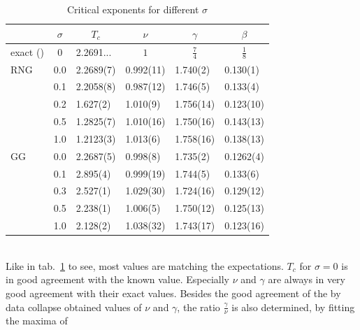     \begin{table}[htbp]
        \center
        \begin{tabular}{l l l l l l}
            \toprule
             & \multicolumn{1}{c}{\(\sigma\)} & \multicolumn{1}{c}{\(T_c\)} & \multicolumn{1}{c}{\(\nu\)} & \multicolumn{1}{c}{\(\gamma\)} & \multicolumn{1}{c}{\(\beta\)}\\
            \midrule
            exact (\cite[p. 59]{Pelissetto2002}) & \multicolumn{1}{c}{\(0\)} & 2.2691... & \multicolumn{1}{c}{\(1\)} & \multicolumn{1}{c}{\(\frac{7}{4}\)} & \multicolumn{1}{c}{\(\frac{1}{8}\)}\\
            \midrule
            RNG          & 0.0 & 2.2689(7)& 0.992(11)& 1.740(2) & 0.130(1) \\
                         & 0.1 & 2.2058(8)& 0.987(12)& 1.746(5) & 0.133(4) \\
                         & 0.2 & 1.627(2) & 1.010(9) & 1.756(14)& 0.123(10)\\
                         & 0.5 & 1.2825(7)& 1.010(16)& 1.750(16)& 0.143(13)\\
                         & 1.0 & 1.2123(3)& 1.013(6) & 1.758(16)& 0.138(13)\\
            \midrule
            GG           & 0.0 & 2.2687(5)& 0.998(8) & 1.735(2) & 0.1262(4)\\
                         & 0.1 & 2.895(4) & 0.999(19)& 1.744(5) & 0.133(6) \\
                         & 0.3 & 2.527(1) & 1.029(30)& 1.724(16)& 0.129(12)\\
                         & 0.5 & 2.238(1) & 1.006(5) & 1.750(12)& 0.125(13)\\
                         & 1.0 & 2.128(2) & 1.038(32)& 1.743(17)& 0.123(16)\\

            \bottomrule
        \end{tabular}
        \caption[Critical Exponents for Different $\sigma$]{Critical exponents for different $\sigma$}
        \label{tab:critExp}
    \end{table}\\
    Like in tab.\ \ref{tab:critExp} to see, most values
    are matching the expectations. \(T_c\) for \(\sigma = 0\) is in good
    agreement with the known value. Especially \(\nu\) and \(\gamma\)
    are always in very good agreement with their exact values. Besides the
    good agreement of the by data collapse obtained values of \(\nu\) and \(\gamma\),
    the ratio \(\frac{\gamma}{\nu}\) is also determined, by fitting the maxima of
